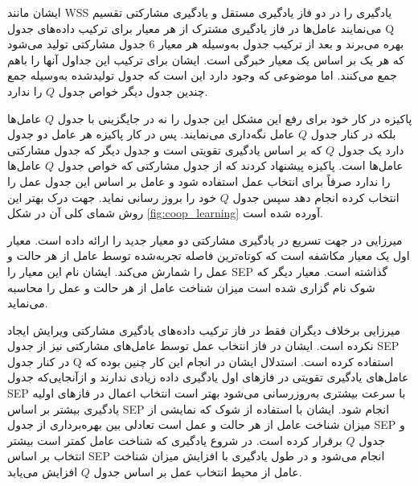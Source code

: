 ایشان مانند WSS یادگیری را در دو فاز یادگیری مستقل و یادگیری مشارکتی تقسیم می‌نمایند عامل‌ها در فاز یادگیری مشترک از هر معیار برای ترکیب داده‌های جدول Q بهره می‌برند و بعد از ترکیب جدول به‌وسیله هر معیار 6 جدول مشارکتی تولید می‌شود که هر یک بر اساس یک معیار خبرگی است. ایشان برای ترکیب این جداول آنها را باهم جمع می‌کنند. اما موضوعی که وجود دارد این است که جدول تولیدشده به‌وسیله جمع چندین جدول دیگر خواص جدول $Q$ را ندارد.

 پاکیزه در کار خود برای رفع این مشکل این جدول را نه در جایگزینی با جدول $Q$ عامل‌ها بلکه در کنار جدول $Q$ عامل نگه‌داری می‌نمایند.
پس در کار پاکیزه هر عامل دو جدول دارد یک جدول $Q$ که بر اساس یادگیری تقویتی است و جدول دیگر که جدول مشارکتی عامل‌ها است. پاکیزه پیشنهاد کردند که از جدول مشارکتی که خواص جدول $Q$ عامل‌ها را ندارد صرفاً برای انتخاب عمل استفاده شود و عامل بر اساس این جدول عمل را انتخاب کرده انجام دهد سپس جدول $Q$ خود را بروز رسانی نماید. جهت درک بهتر این روش شمای کلی آن در شکل \ref{fig:coop_learning} آورده شده است.


میرزایی در جهت تسریع در یادگیری مشارکتی دو معیار جدید را ارائه داده است. معیار اول یک معیار مکاشفه است که کوتاه‌ترین فاصله تجربه‌شده توسط عامل از هر حالت و عمل را شمارش می‌کند. ایشان نام این معیار را SEP گذاشته است. معیار دیگر که شوک نام گزاری شده است میزان شناخت عامل از هر حالت و عمل را محاسبه می‌نماید.

میرزایی برخلاف دیگران فقط در فاز ترکیب داده‌های یادگیری مشارکتی ویرایش ایجاد نکرده است. ایشان در فاز انتخاب عمل توسط عامل‌های مشارکتی نیز از جدول SEP در کنار جدول Q استفاده کرده است. استدلال ایشان در انجام این کار چنین بوده که عامل‌های یادگیری تقویتی در فازهای اول یادگیری داده زیادی ندارند و ازآنجایی‌که جدول SEP با سرعت بیشتری به‌روزرسانی می‌شود بهتر است انتخاب اعمال در فازهای اولیه یادگیری بیشتر بر اساس SEP انجام شود. ایشان با استفاده از شوک که نمایشی از میزان شناخت عامل از هر حالت و عمل است تعادلی بین بهره‌برداری از جدول SEP و جدول $Q$ برقرار کرده است. در شروع یادگیری که شناخت عامل کمتر است بیشتر انتخاب بر اساس SEP انجام می‌شود و در طول یادگیری با افزایش میزان شناخت عامل از محیط انتخاب عمل بر اساس جدول $Q$ افزایش می‌یابد.

